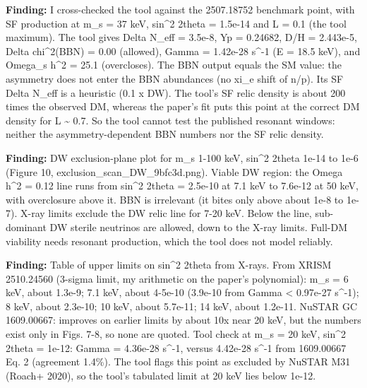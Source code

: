 \documentclass[11pt,a4paper]{article}
\begin{document}
\textbf{Finding:} I cross-checked the tool against the 2507.18752 benchmark point, with SF production at m\_s = 37 keV, sin\textasciicircum{}2 2theta = 1.5e-14 and L = 0.1 (the tool maximum). The tool gives Delta N\_eff = 3.5e-8, Yp = 0.24682, D/H = 2.443e-5, Delta chi\textasciicircum{}2(BBN) = 0.00 (allowed), Gamma = 1.42e-28 s\textasciicircum{}-1 (E = 18.5 keV), and Omega\_s h\textasciicircum{}2 = 25.1 (overcloses). The BBN output equals the SM value: the asymmetry does not enter the BBN abundances (no xi\_e shift of n/p). Its SF Delta N\_eff is a heuristic (0.1 x DW). The tool's SF relic density is about 200 times the observed DM, whereas the paper's fit puts this point at the correct DM density for L \textasciitilde{} 0.7. So the tool cannot test the published resonant windows: neither the asymmetry-dependent BBN numbers nor the SF relic density.

\textbf{Finding:} DW exclusion-plane plot for m\_s 1-100 keV, sin\textasciicircum{}2 2theta 1e-14 to 1e-6 (Figure 10, exclusion\_scan\_DW\_9bfc3d.png). Viable DW region: the Omega h\textasciicircum{}2 = 0.12 line runs from sin\textasciicircum{}2 2theta = 2.5e-10 at 7.1 keV to 7.6e-12 at 50 keV, with overclosure above it. BBN is irrelevant (it bites only above about 1e-8 to 1e-7). X-ray limits exclude the DW relic line for 7-20 keV. Below the line, sub-dominant DW sterile neutrinos are allowed, down to the X-ray limits. Full-DM viability needs resonant production, which the tool does not model reliably.

\textbf{Finding:} Table of upper limits on sin\textasciicircum{}2 2theta from X-rays. From XRISM 2510.24560 (3-sigma limit, my arithmetic on the paper's polynomial): m\_s = 6 keV, about 1.3e-9; 7.1 keV, about 4-5e-10 (3.9e-10 from Gamma \textless{} 0.97e-27 s\textasciicircum{}-1); 8 keV, about 2.3e-10; 10 keV, about 5.7e-11; 14 keV, about 1.2e-11. NuSTAR GC 1609.00667: improves on earlier limits by about 10x near 20 keV, but the numbers exist only in Figs. 7-8, so none are quoted. Tool check at m\_s = 20 keV, sin\textasciicircum{}2 2theta = 1e-12: Gamma = 4.36e-28 s\textasciicircum{}-1, versus 4.42e-28 s\textasciicircum{}-1 from 1609.00667 Eq. 2 (agreement 1.4\%). The tool flags this point as excluded by NuSTAR M31 (Roach+ 2020), so the tool's tabulated limit at 20 keV lies below 1e-12.
\end{document}
